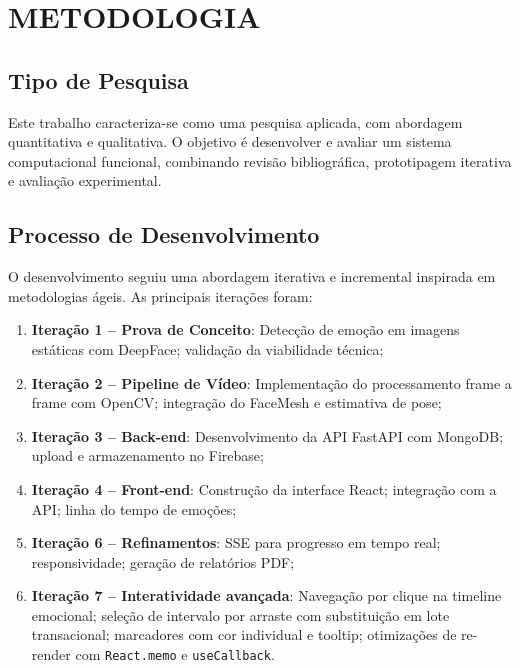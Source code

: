 \documentclass[
	12pt,
	openright,
	oneside,
	a4paper,
	english,
	brazil
	]{abntex2}
\begin{document}
\chapter{METODOLOGIA}
\label{cap:metodologia}

\section{Tipo de Pesquisa}

Este trabalho caracteriza-se como uma pesquisa aplicada, com abordagem quantitativa e qualitativa. O objetivo é desenvolver e avaliar um sistema computacional funcional, combinando revisão bibliográfica, prototipagem iterativa e avaliação experimental.

\section{Processo de Desenvolvimento}

O desenvolvimento seguiu uma abordagem iterativa e incremental inspirada em metodologias ágeis. As principais iterações foram:

\begin{enumerate}
    \item \textbf{Iteração 1 -- Prova de Conceito}: Detecção de emoção em imagens estáticas com DeepFace; validação da viabilidade técnica;
    \item \textbf{Iteração 2 -- Pipeline de Vídeo}: Implementação do processamento frame a frame com OpenCV; integração do FaceMesh e estimativa de pose;
    \item \textbf{Iteração 3 -- Back-end}: Desenvolvimento da API FastAPI com MongoDB; upload e armazenamento no Firebase;
    \item \textbf{Iteração 4 -- Front-end}: Construção da interface React; integração com a API; linha do tempo de emoções;
    \item \textbf{Iteração 6 -- Refinamentos}: SSE para progresso em tempo real; responsividade; geração de relatórios PDF;
    \item \textbf{Iteração 7 -- Interatividade avançada}: Navegação por clique na timeline emocional; seleção de intervalo por arraste com substituição em lote transacional; marcadores com cor individual e tooltip; otimizações de re-render com \texttt{React.memo} e \texttt{useCallback}.
\end{enumerate}
\end{document}
